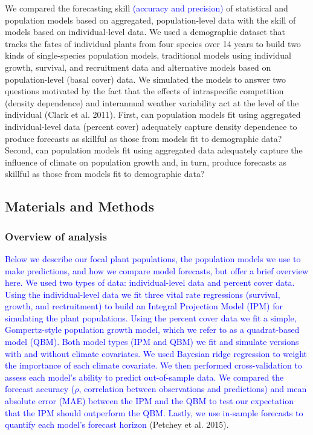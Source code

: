 \documentclass[12pt,]{article}
\begin{document}
We compared the forecasting skill
\textcolor{blue}{(accuracy and precision)} of statistical and population
models based on aggregated, population-level data with the skill of
models based on individual-level data. We used a demographic dataset
that tracks the fates of individual plants from four species over 14
years to build two kinds of single-species population models,
traditional models using individual growth, survival, and recruitment
data and alternative models based on population-level (basal cover)
data. We simulated the models to answer two questions motivated by the
fact that the effects of intraspecific competition (density dependence)
and interannual weather variability act at the level of the individual
(Clark et al. 2011). First, can population models fit using aggregated
individual-level data (percent cover) adequately capture density
dependence to produce forecasts as skillful as those from models fit to
demographic data? Second, can population models fit using aggregated
data adequately capture the influence of climate on population growth
and, in turn, produce forecasts as skillful as those from models fit to
demographic data?

\subsection{Materials and Methods}\label{materials-and-methods}

\subsubsection{Overview of analysis}\label{overview-of-analysis}

\textcolor{blue}{Below we describe our focal plant populations, the population models we use to make predictions, and how we compare model forecasts, but offer a brief overview here.
We used two types of data: individual-level data and percent cover data.
Using the individual-level data we fit three vital rate regressions (survival, growth, and rectruitment) to build an Integral Projection Model (IPM) for simulating the plant populations.
Using the percent cover data we fit a simple, Gompertz-style population growth model, which we refer to as a quadrat-based model (QBM).
Both model types (IPM and QBM) we fit and simulate versions with and without climate covariates.
We used Bayesian ridge regression to weight the importance of each climate covariate.
We then performed cross-validation to assess each model's ability to predict out-of-sample data.
We compared the forecast accuracy ($\rho$, correlation between observations and predictions) and mean absolute error (MAE) between the IPM and the QBM to test our expectation that the IPM should outperform the QBM.
Lastly, we use in-sample forecasts to quantify each model's forecast horizon}
(Petchey et al. 2015).
\end{document}
